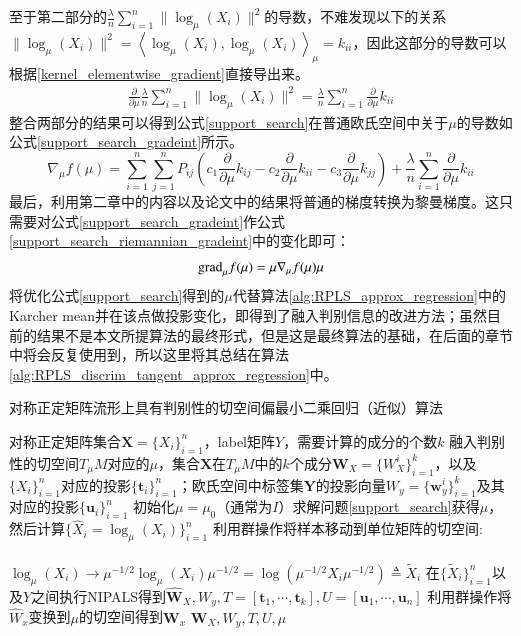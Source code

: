 至于第二部分的$\frac{\lambda}{n}\sum_{i=1}^{n} \|\log_{\mu}(X_i)\|^2$的导数，不难发现以下的关系$\|\log_{\mu}(X_i)\|^2=\left<\log_{\mu}(X_i),\log_{\mu}(X_i)\right>_{\mu}=k_{ii}$，因此这部分的导数可以根据\ref{kernel_elementwise_gradient}直接导出来。
\begin{equation}
\label{support_search_part2_gradeint}
\begin{split}
\frac{\partial}{\partial \mu}\frac{\lambda}{n}\sum_{i=1}^{n} \|\log_{\mu}(X_i)\|^2=\frac{\lambda}{n}\sum_{i=1}^{n}\frac{\partial}{\partial \mu}k_{ii}
\end{split}
\end{equation}
整合两部分的结果可以得到公式\ref{support_search}在普通欧氏空间中关于$\mu$的导数如公式\ref{support_search_gradeint}所示。
\begin{equation}
\label{support_search_gradeint}
\nabla_{\mu} f(\mu)=\sum_{i=1}^{n}\sum_{j=1}^{n}P_{ij}\left(c_1\frac{\partial}{\partial \mu}k_{ij}-c_2\frac{\partial}{\partial \mu}k_{ii}-c_3\frac{\partial}{\partial \mu}k_{jj}\right)+\frac{\lambda}{n}\sum_{i=1}^{n}\frac{\partial}{\partial \mu}k_{ii}
\end{equation}
最后，利用第二章中的内容以及论文\cite{Statistics_SLEDML,Maniopt_DiscreteCurveFitting}中的结果将普通的梯度转换为黎曼梯度。这只需要对公式\ref{support_search_gradeint}作公式\ref{support_search_riemannian_gradeint}中的变化即可：
\begin{equation}
\label{support_search_riemannian_gradeint}
{\rm grad}_{\mu}f(\mu)=\mu \nabla_{\mu} f(\mu) \mu
\end{equation}
将优化公式\ref{support_search}得到的$\mu$代替算法\ref{alg:RPLS_approx_regression}中的Karcher mean并在该点做投影变化，即得到了融入判别信息的改进方法；虽然目前的结果不是本文所提算法的最终形式，但是这是最终算法的基础，在后面的章节中将会反复使用到，所以这里将其总结在算法\ref{alg:RPLS_discrim_tangent_approx_regression}中。
\begin{algorithm}
\caption{对称正定矩阵流形上具有判别性的切空间偏最小二乘回归（近似）算法}
\label{alg:RPLS_discrim_tangent_approx_regression}
\begin{algorithmic}[1]
\REQUIRE 对称正定矩阵集合$\bm{X}=\{X_i\}_{i=1}^{n}$，label矩阵${Y}$，需要计算的成分的个数$k$
\ENSURE 融入判别性的切空间$T_{\mu}M$对应的$\mu$，集合$\bm{X}$在$T_{\mu}M$中的$k$个成分$\bm{W}_X=\{W_{X}^{i}\}_{i=1}^{k}$，以及$\{X_i\}_{i=1}^{n}$对应的投影$\{\bm{t}_i\}_{i=1}^{n}$；欧氏空间中标签集$\bm{Y}$的投影向量$W_y=\{\bm{w}_{y}^{i}\}_{i=1}^{k}$及其对应的投影$\{\bm{u}_i\}_{i=1}^{n}$
\STATE 初始化$\mu=\mu_0$（通常为$I$）求解问题\ref{support_search}获得$\mu$，然后计算$\{\hat{X}_i=\log_{\mu}(X_i)\}_{i=1}^{n}$
\STATE 利用群操作将样本移动到单位矩阵的切空间:\\
 ~~~~~~~~~~~~~~~~~~~~$\log_{\mu}(X_i)\rightarrow \mu^{-1/2}\log_{\mu}(X_i)\mu^{-1/2}=\log(\mu^{-1/2}X_i\mu^{-1/2})\triangleq \tilde{X}_i$
\STATE 在$\{\tilde{X}_{i}\}_{i=1}^{n}$以及${Y}$之间执行NIPALS\cite{pls_NIPALS}得到$\hat{\bm{W}}_X,W_y,T=[\bm{t}_1,\cdots,\bm{t}_k],U=[\bm{u}_1,\cdots,\bm{u}_n]$
\STATE 利用群操作将$\hat{W}_x$变换到$\mu$的切空间得到$\bm{W}_x$
\RETURN $\bm{W}_X,W_y,T,U,\mu$
\end{algorithmic}
\end{algorithm}\\
